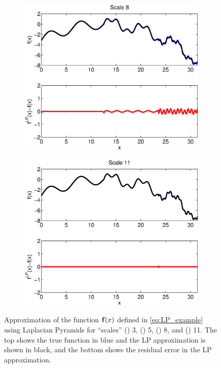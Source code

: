 \begin{figure}[t]
\begin{subfigure}{0.22\textwidth}
\includegraphics[width=\textwidth]{Scale8_S2}
\caption{}
\label{subfig:LP_ex3}
\end{subfigure}
\begin{subfigure}{0.22\textwidth}
\includegraphics[width=\textwidth]{Scale11_S2}
\caption{}
\label{subfig:LP_ex4}
\end{subfigure}
\caption[Illustration of function approximation using Laplacian Pyramids at different scales]{Approximation of the function $\mathbf{f}(x)$ defined in \eqref{eq:LP_example} using Laplacian Pyramids for ``scales'' () 3, () 5, () 8, and () 11. The top shows the true function in blue and the LP approximation is shown in black, and the bottom shows the residual error in the LP approximation.}
\label{fig:LP_ex}
\end{figure}

